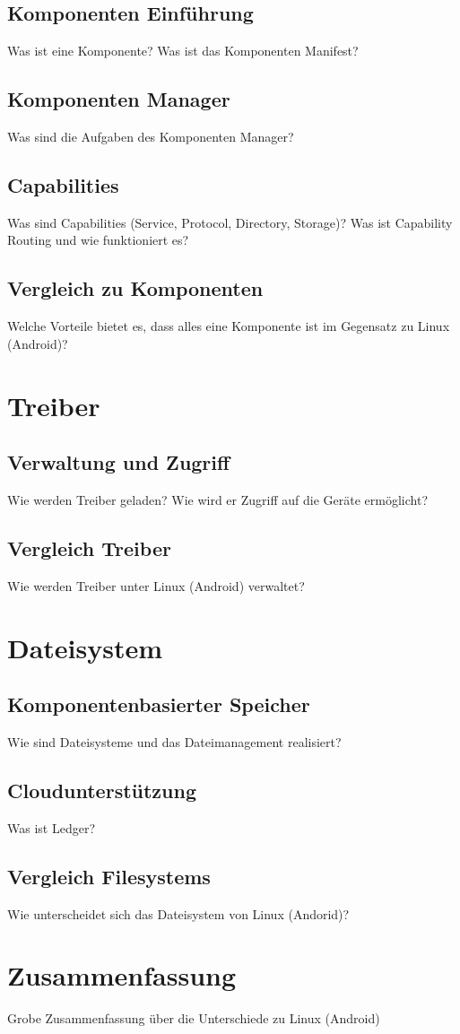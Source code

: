 \documentclass[a4paper]{scrartcl}
\begin{document}
\subsection{Komponenten Einführung}
Was ist eine Komponente?
Was ist das Komponenten Manifest?
\subsection{Komponenten Manager}
Was sind die Aufgaben des Komponenten Manager?
\subsection{Capabilities}
Was sind Capabilities (Service, Protocol, Directory, Storage)?
Was ist Capability Routing und wie funktioniert es?
\subsection{Vergleich zu Komponenten}
Welche Vorteile bietet es, dass alles eine Komponente ist im Gegensatz zu Linux (Android)?
\section{Treiber}
\subsection{Verwaltung und Zugriff}
Wie werden Treiber geladen?
Wie wird er Zugriff auf die Geräte ermöglicht?
\subsection{Vergleich Treiber}
Wie werden Treiber unter Linux (Android) verwaltet?
\section{Dateisystem}
\subsection{Komponentenbasierter Speicher}
Wie sind Dateisysteme und das Dateimanagement realisiert?
\subsection{Cloudunterstützung}
Was ist Ledger?
\subsection{Vergleich Filesystems}
Wie unterscheidet sich das Dateisystem von Linux (Andorid)?
\section{Zusammenfassung}
Grobe Zusammenfassung über die Unterschiede zu Linux (Android)



\end{document}
